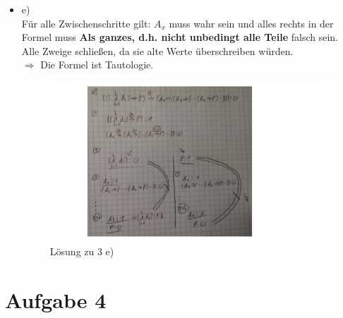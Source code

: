 \documentclass[a4paper]{scrartcl}
\begin{document}
\begin{itemize}
\newpage

    \item e)\\

        Für alle Zwischenschritte gilt: $A_x$ muss wahr sein und alles rechts in der Formel muss \textbf{Als ganzes, d.h. nicht unbedingt alle Teile} falsch sein.\\
        Alle Zweige schließen, da sie alte Werte überschreiben würden.\\
        $\Rightarrow$ Die Formel ist Tautologie.

        \begin{figure}[H]
            \centering
            \includegraphics[scale=0.25]{3-e-tree.png}
            \caption{Lösung zu 3 e)}
            \label{fig:name}
        \end{figure}
\end{itemize}

\newpage

\section*{Aufgabe 4}%
\label{sec:aufgabe_4}
\end{document}
